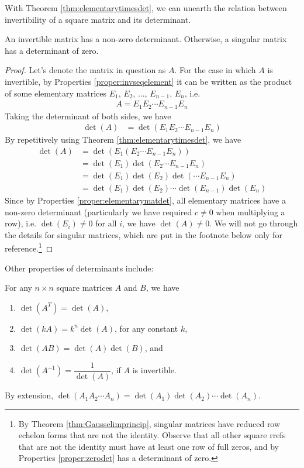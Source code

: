 With Theorem \ref{thm:elementarytimesdet}, we can unearth the relation between invertibility of a square matrix and its determinant.
\begin{proper}
\label{proper:invnonzerodet}
An invertible matrix has a non-zero determinant. Otherwise, a singular matrix has a determinant of zero.
\end{proper}
\begin{proof}
Let's denote the matrix in question as $A$. For the case in which $A$ is invertible, by Properties \ref{proper:invseqelement} it can be written as the product of some elementary matrices $E_1$, $E_2$, $\ldots$, $E_{n-1}$, $E_n$, i.e.\
\begin{align*}
A = E_{1}E_{2} \cdots E_{n-1}E_n
\end{align*}
Taking the determinant of both sides, we have
\begin{align*}
\det(A) &= \det(E_{1}E_{2} \cdots E_{n-1}E_n)
\end{align*}
By repetitively using Theorem \ref{thm:elementarytimesdet}, we have
\begin{align*}
\det(A) &= \det(E_{1}(E_{2} \cdots E_{n-1}E_n)) \\
&= \det(E_1) \det(E_{2} \cdots E_{n-1}E_n) \\
&= \det(E_1) \det(E_{2}) \det(\cdots E_{n-1}E_n) \\
&= \det(E_1) \det(E_{2}) \cdots \det(E_{n-1})\det(E_n)
\end{align*}
Since by Properties \ref{proper:elementarymatdet}, all elementary matrices have a non-zero determinant (particularly we have required $c \neq 0$ when multiplying a row), i.e. $\det(E_i) \neq 0$ for all $i$, we have $\det(A) \neq 0$. We will not go through the details for singular matrices, which are put in the footnote below only for reference.\footnote{By Theorem \ref{thm:Gausselimprincip}, singular matrices have reduced row echelon forms that are not the identity. Observe that all other square rrefs that are not the identity must have at least one row of full zeros, and by Properties \ref{proper:zerodet} has a determinant of zero.} 
\end{proof}
Other properties of determinants include:
\begin{proper}
\label{proper:properdet}
For any $n \times n$ square matrices $A$ and $B$, we have
\begin{enumerate}
\item $\det(A^T) = \det(A)$,
\item $\det(kA) = k^n \det(A)$, for any constant $k$,
\item $\det(AB) = \det(A)\det(B)$, and
\item $\det(A^{-1}) = \dfrac{1}{\det(A)}$, if $A$ is invertible.
\end{enumerate}
By extension, $\det(A_1A_2\cdots A_n) = \det(A_1)\det(A_2)\cdots\det(A_n)$.
\end{proper}
